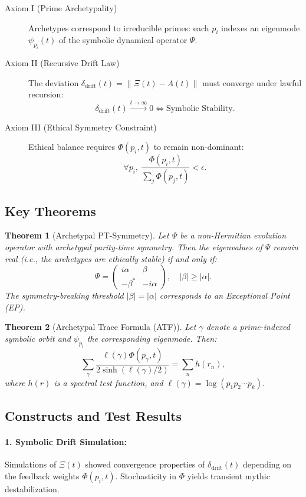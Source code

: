 \documentclass{article}
\theoremstyle{plain}
\newtheorem{theorem}{Theorem}
\begin{document}
\begin{description}
  \item[Axiom I (Prime Archetypality)] Archetypes correspond to irreducible primes: each $p_i$ indexes an eigenmode $\psi_{p_i}(t)$ of the symbolic dynamical operator $\Psi$.
  \item[Axiom II (Recursive Drift Law)] The deviation $\delta_{\text{drift}}(t) = \| \Xi(t) - A(t) \|$ must converge under lawful recursion: 
  \[
    \delta_{\text{drift}}(t) \xrightarrow{t \to \infty} 0 \iff \text{Symbolic Stability}.
  \]
  \item[Axiom III (Ethical Symmetry Constraint)] Ethical balance requires $\Phi(p_i, t)$ to remain non-dominant:
  \[
    \forall p_i, \ \frac{\Phi(p_i, t)}{\sum_j \Phi(p_j, t)} < \epsilon.
  \]
\end{description}

\subsection{Key Theorems}

\begin{theorem}[Archetypal PT-Symmetry]
Let $\Psi$ be a non-Hermitian evolution operator with archetypal parity-time symmetry. Then the eigenvalues of $\Psi$ remain real (i.e., the archetypes are ethically stable) if and only if:
\[
\Psi = \begin{pmatrix}
i\alpha & \beta \\
-\beta^* & -i\alpha
\end{pmatrix}, \quad |\beta| \geq |\alpha|.
\]
The symmetry-breaking threshold $|\beta| = |\alpha|$ corresponds to an \emph{Exceptional Point} (EP).
\end{theorem}

\begin{theorem}[Archetypal Trace Formula (ATF)]
Let $\gamma$ denote a prime-indexed symbolic orbit and $\psi_{p_i}$ the corresponding eigenmode. Then:
\[
\sum_{\gamma} \frac{\ell(\gamma)\Phi(p_\gamma, t)}{2 \sinh(\ell(\gamma)/2)} = \sum_n h(r_n),
\]
where $h(r)$ is a spectral test function, and $\ell(\gamma) = \log(p_1 p_2 \cdots p_k)$.
\end{theorem}

\subsection{Constructs and Test Results}

\paragraph{1. Symbolic Drift Simulation:}  
Simulations of $\Xi(t)$ showed convergence properties of $\delta_{\text{drift}}(t)$ depending on the feedback weights $\Phi(p_i, t)$. Stochasticity in $\Phi$ yields transient mythic destabilization.
\end{document}
